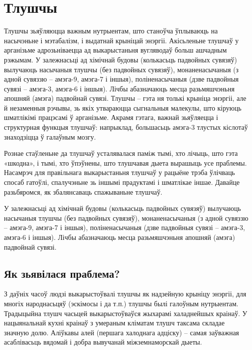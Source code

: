 \chapter{Тлушчы}

Тлушчы зьяўляюцца важным нутрыентам, што станоўча ўплываюць на насычэньне і мэтабалізм, і выдатнай крыніцай энэргіі. Акісьленьне тлушчаў у арганізьме адрозьніваецца ад выкарыстаньня вугляводаў больш ашчадным рэжымам. У залежнасьці ад хімічнай будовы (колькасьць падвойных сувязяў) вылучаюць насычаныя тлушчы (без падвойных сувязяў), монаненасычаныя (з адной сувяззю – амэга-9, амэга-7 і іншыя), поліненасычаныя (дзве падвойныя сувязі – амэга-3, амэга-6 і іншыя). Лічбы абазначаюць месца разьмяшчэньня апошняй (амэга) падвойнай сувязі. Тлушчы – гэта ня толькі крыніца энэргіі, але й незаменныя рэчывы, зь якіх утвараюцца сыгнальныя малекулы, што кіруюць шматлікімі працэсамі ў арганізьме. Акрамя гэтага, важнай зьяўляецца і структурная функцыя тлушчаў: напрыклад, большасьць амэга-3 тлустых кіслотаў знаходзіцца ў галаўным мозгу.

Рознае стаўленьне да тлушчаў усталявалася паміж тымі, хто лічыць, што гэта «шкодна», і тымі, хто ўпэўнены, што тлушчавая дыета вырашыць усе праблемы. Насамрэч для правільнага выкарыстаньня тлушчаў у рацыёне трэба ўлічваць спосаб гатоўлі, спалучэньне зь іншымі прадуктамі і шматлікае іншае. Давайце разьбяромся, як збалянсаваць спажываньне тлушчаў.

У залежнасьці ад хімічнай будовы (колькасьць падвойных сувязяў) вылучаюць насычаныя тлушчы (без падвойных сувязяў), монаненасычаныя (з адной сувяззю – амэга-9, амэга-7 і іншыя), поліненасычаныя (дзве падвойныя сувязі – амэга-3, амэга-6 і іншыя). Лічбы абазначаюць месца разьмяшчэньня апошняй (амэга) падвойнай сувязі.

\section{Як зьявілася праблема?}

З даўніх часоў людзі выкарыстоўвалі тлушчы як надзейную крыніцу энэргіі, для многіх народнасьцяў (эскімосы і да т.п.) тлушчы былі галоўным нутрыентам. Традыцыйна тлушч часьцей выкарыстоўваўся жыхарамі халаднейшых краінаў. У нацыянальнай кухні краінаў з умераным кліматам тлушч таксама складае значную долю. Аліўкавы алей (першага халоднага адціску) – самая заўважная асаблівасьць вядомай і добра вывучанай міжземнаморскай дыеты.

